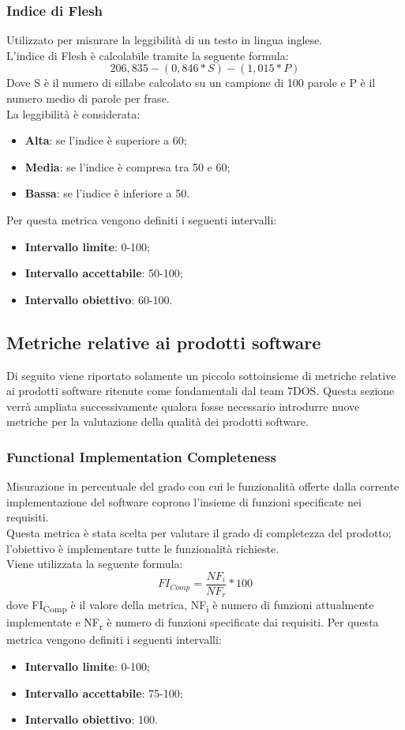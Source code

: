 \subsubsection{Indice di Flesh}
Utilizzato per misurare la leggibilità di un testo in lingua inglese.\\
L'indice di Flesh è calcolabile tramite la seguente formula:
	$$
		206,835-(0,846*S)-(1,015*P)
	$$
Dove S è il numero di sillabe calcolato su un campione di 100 parole e P è il numero medio di parole per frase.\\
La leggibilità è considerata:
	\begin{itemize}
		\item{\textbf{Alta}}: se l'indice è superiore a 60;
		\item{\textbf{Media}}: se l'indice è compresa tra 50 e 60;
		\item{\textbf{Bassa}}: se l'indice è inferiore a 50.
	\end{itemize}
Per questa metrica vengono definiti i seguenti intervalli: 
\begin{itemize}
	\item{\textbf{Intervallo limite}: 0-100;}
	\item{\textbf{Intervallo accettabile}: 50-100;}
	\item{\textbf{Intervallo obiettivo}: 60-100.}
\end{itemize} 
\subsection{Metriche relative ai prodotti software}
Di seguito viene riportato solamente un piccolo sottoinsieme di metriche relative ai prodotti software ritenute come fondamentali dal team 7DOS.
Questa sezione verrà ampliata successivamente qualora fosse necessario introdurre nuove metriche per la valutazione della qualità dei prodotti software. 
\subsubsection{Functional Implementation Completeness}
Misurazione in percentuale del grado con cui le funzionalità offerte dalla corrente implementazione del software coprono l'insieme di funzioni specificate nei requisiti.\\
Questa metrica è stata scelta per valutare il grado di completezza del prodotto; l'obiettivo è implementare tutte le funzionalità richieste.\\
Viene utilizzata la seguente formula:
$$FI_{Comp}=\frac{NF_i}{NF_r}*100$$
dove FI\textsubscript{Comp} è il valore della metrica, NF\textsubscript{i} è numero di funzioni attualmente implementate e NF\textsubscript{r} è numero di funzioni specificate dai requisiti.
Per questa metrica vengono definiti i seguenti intervalli: 
\begin{itemize}
	\item{\textbf{Intervallo limite}: 0-100;}
	\item{\textbf{Intervallo accettabile}: 75-100;}
	\item{\textbf{Intervallo obiettivo}: 100.}
\end{itemize}

